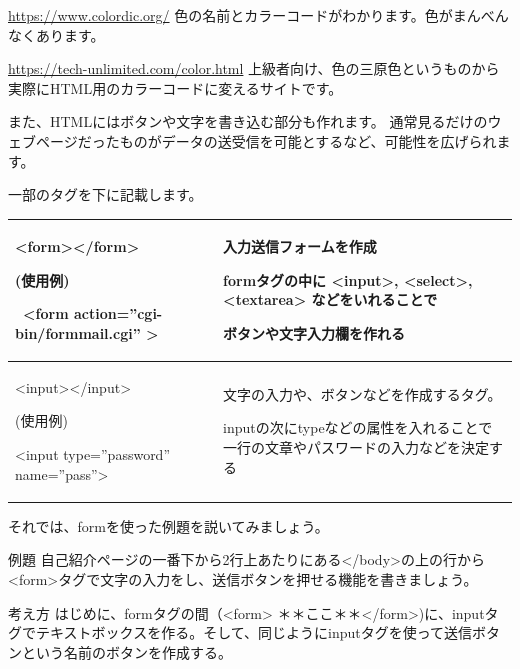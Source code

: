 \documentclass[a4paper,12pt,dvipdfmx]{jarticle}
\begin{document}
\url{https://www.colordic.org/}\newline
色の名前とカラーコードがわかります。色がまんべんなくあります。

\url{https://tech-unlimited.com/color.html}\newline
上級者向け、色の三原色というものから実際にHTML用のカラーコードに変えるサイトです。

\clearpage
また、HTMLにはボタンや文字を書き込む部分も作れます。\newline
通常見るだけのウェブページだったものがデータの送受信を可能とするなど、可能性を広げられます。

一部のタグを下に記載します。

\begin{center}
	\tablefirsthead{}
	\tablehead{}
	\tabletail{}
	\tablelasttail{}
	\begin{supertabular}{|m{8.6cm}|m{7.91cm}|}
		\hline
		{\textless}form{\textgreater}{\textless}/form{\textgreater}

		(使用例)

		\ {\textless}form action=”cgi-bin/formmail.cgi” {\textgreater} &
		入力送信フォームを作成

		formタグの中に
		{\textless}input{\textgreater},
		{\textless}select{\textgreater},
		{\textless}textarea{\textgreater}
		などをいれることで

		ボタンや文字入力欄を作れる\\\hline
		{\textless}input{\textgreater}{\textless}/input{\textgreater}

		(使用例)

		{\textless}input type=”password” name=”pass”{\textgreater} &
		文字の入力や、ボタンなどを作成するタグ。

		inputの次にtypeなどの属性を入れることで一行の文章やパスワードの入力などを決定する\\\hline
	\end{supertabular}
\end{center}

\bigskip

それでは、formを使った例題を説いてみましょう。

例題\newline
自己紹介ページの一番下から2行上あたりにある{\textless}/body{\textgreater}の上の行から{\textless}form{\textgreater}タグで文字の入力をし、送信ボタンを押せる機能を書きましょう。

考え方\newline
はじめに、formタグの間（{\textless}form{\textgreater}
＊＊ここ＊＊{\textless}/form{\textgreater})に、inputタグでテキストボックスを作る。そして、同じようにinputタグを使って送信ボタンという名前のボタンを作成する。
\end{document}
